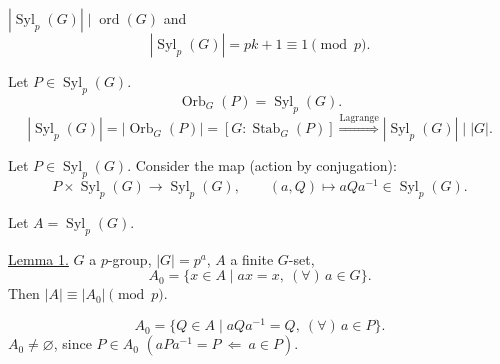\bigskip
\noindent{}\quad
$|\operatorname{Syl}_p(G)|\mid\operatorname{ord}(G)$ and
\[
|\operatorname{Syl}_p(G)|=pk+1\equiv1\pmod p.
\]

\bigskip
\noindent{}\quad
Let $P\in\operatorname{Syl}_p(G)$.
\[
\operatorname{Orb}_G(P)=\operatorname{Syl}_p(G).
\]
\[
|\operatorname{Syl}_p(G)|=|\operatorname{Orb}_G(P)|
=[G:\operatorname{Stab}_G(P)]
\overset{\text{Lagrange}}{\Longrightarrow}
|\operatorname{Syl}_p(G)|\mid|G|.
\]

\medskip
\noindent Let $P\in\operatorname{Syl}_p(G)$. Consider the map
(action by conjugation):
\[
P\times\operatorname{Syl}_p(G)\longrightarrow\operatorname{Syl}_p(G),
\qquad (a,Q)\longmapsto aQa^{-1}\in\operatorname{Syl}_p(G).
\]

\noindent Let $A=\operatorname{Syl}_p(G)$.

\medskip
\noindent\underline{Lemma 1.}\quad
$G$ a $p$-group, $|G|=p^a$, $A$ a finite $G$-set,
\[
A_0=\{x\in A\mid ax=x,\ (\forall)\,a\in G\}.
\]
\noindent Then $|A|\equiv|A_0|\pmod p$.

\medskip
\noindent
\[
A_0=\{Q\in A\mid aQa^{-1}=Q,\ (\forall)\,a\in P\}.
\]
\noindent $A_0\neq\varnothing$, since $P\in A_0$
$(aPa^{-1}=P\ \Longleftarrow\ a\in P)$.
